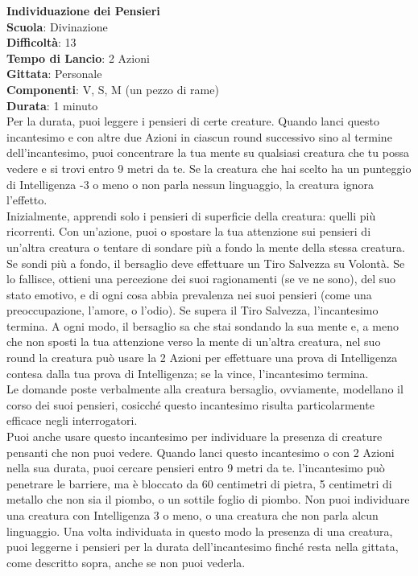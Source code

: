 \begin{multicols}{2}
\medskip\textbf{Individuazione dei Pensieri}\\
\textbf{Scuola}: Divinazione\\
\textbf{Difficoltà}:  13\\
\textbf{Tempo di Lancio}: 2 Azioni\\
\textbf{Gittata}: Personale\\
\textbf{Componenti}: V, S, M (un pezzo di rame)\\
\textbf{Durata}: 1 minuto\\
Per la durata, puoi leggere i pensieri di certe creature. Quando lanci questo incantesimo e con altre due Azioni in ciascun round successivo sino al termine dell'incantesimo, puoi concentrare la tua mente su qualsiasi creatura che tu possa vedere e si trovi entro 9 metri da te. Se la creatura che hai scelto ha un punteggio di Intelligenza -3 o meno o non parla nessun linguaggio, la creatura ignora l’effetto.\\
Inizialmente, apprendi solo i pensieri di superficie della creatura: quelli più ricorrenti. Con un'azione, puoi o spostare la tua attenzione sui pensieri di un'altra creatura o tentare di sondare più a fondo la mente della stessa creatura. Se sondi più a fondo, il bersaglio deve effettuare un Tiro Salvezza su Volontà. Se lo fallisce, ottieni una percezione dei suoi ragionamenti (se ve ne sono), del suo stato emotivo, e di ogni cosa abbia prevalenza nei suoi pensieri (come una preoccupazione, l’amore, o l’odio). Se supera il Tiro Salvezza, l'incantesimo termina. A ogni modo, il bersaglio sa che stai sondando la sua mente e, a meno che non sposti la tua attenzione verso la mente di un'altra creatura, nel suo round la creatura può usare la 2 Azioni per effettuare una prova di Intelligenza contesa dalla tua prova di Intelligenza; se la vince, l'incantesimo termina.\\
Le domande poste verbalmente alla creatura bersaglio, ovviamente, modellano il corso dei suoi pensieri, cosicché questo incantesimo risulta particolarmente efficace negli interrogatori.\\
Puoi anche usare questo incantesimo per individuare la presenza di creature pensanti che non puoi vedere. Quando lanci questo incantesimo o con 2 Azioni nella sua durata, puoi cercare pensieri entro 9 metri da te. l'incantesimo può penetrare le barriere, ma è bloccato da 60 centimetri di pietra, 5 centimetri di metallo che non sia il piombo, o un sottile foglio di piombo. Non puoi individuare una creatura con Intelligenza 3 o meno, o una creatura che non parla alcun linguaggio. Una volta individuata in questo modo la presenza di una creatura, puoi leggerne i pensieri per la durata dell'incantesimo finché resta nella gittata, come descritto sopra, anche se non puoi vederla.


\end{multicols}
